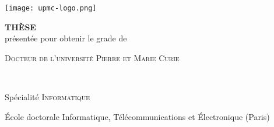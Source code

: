 




\frontmatter %

\pagestyle{plain} %


\thispagestyle{empty}

\begin{titlepage}
        \begin{center}
            \texttt{[image: upmc-logo.png]}
        \end{center}
       
        \begin{center}
           
            \textbf{TH\`ESE}\\
            présentée pour obtenir le grade de\\
            \vspace*{0.5cm}
            \begin{center}\textsc{Docteur de l'université Pierre et Marie Curie}\end{center} \ \\
           
            \vspace*{0.5cm}
           
            Sp\'ecialit\'e \textsc{Informatique}\ \\
           
            \vspace*{0.5cm}
           
            École doctorale Informatique, Télécommunications et Électronique (Paris)
            \vspace*{1cm}
           
        \end{center}
       

\end{titlepage}
